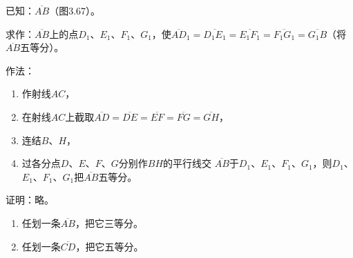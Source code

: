 \begin{example}
    已知：$\overline{AB}$（图3.67）。

求作：$\overline{AB}$上的点$D_1$、$E_1$、$F_1$、$G_1$，使$\overline{AD}_1=\overline{D_1E_1}=\overline{E_1F_1}=\overline{F_1G_1}=\overline{G_1B}$（将$\overline{AB}$五等分）。

作法：
\begin{enumerate}
    \item  作射线$AC$，
    \item  在射线$AC$上截取$\overline{AD}=\overline{DE}=\overline{EF}=\overline{FG}=\overline{GH}$，
    \item  连结$B$、$H$，
    \item  过各分点$D$、$E$、$F$、$G$分别作$BH$的平行线交
$\overline{AB}$于$D_1$、$E_1$、$F_1$、$G_1$，则$D_1$、$E_1$、$F_1$、$G_1$把$\overline{AB}$五等分。
\end{enumerate}

证明：略。
\end{example}

\begin{Practice}
\begin{enumerate}
    \item 任划一条$\overline{AB}$，把它三等分。
    \item 任划一条$\overline{CD}$，把它五等分。
\end{enumerate}
\end{Practice}

